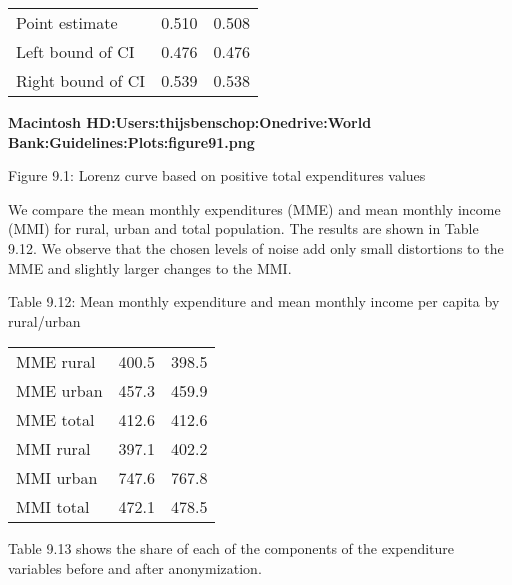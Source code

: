 \documentclass[letterpaper,10pt,english]{sphinxmanual}
\begin{document}
\begin{savenotes}\sphinxattablestart
\centering
\begin{tabulary}{\linewidth}[t]{|T|T|T|}
\hline
\sphinxstyletheadfamily &\sphinxstyletheadfamily 
{}
&\sphinxstyletheadfamily 
{}
\\
\hline
Point estimate
&
0.510
&
0.508
\\
\hline
Left bound of CI
&
0.476
&
0.476
\\
\hline
Right bound of CI
&
0.539
&
0.538
\\
\hline
\end{tabulary}
\par
\sphinxattableend\end{savenotes}

{\color{red}\bfseries{}\textbar{}Macintosh HD:Users:thijsbenschop:Onedrive:World
Bank:Guidelines:Plots:figure91.png\textbar{}}

Figure 9.1: Lorenz curve based on positive total expenditures values

We compare the mean monthly expenditures (MME) and mean monthly income
(MMI) for rural, urban and total population. The results are shown in
Table 9.12. We observe that the chosen levels of noise add only small
distortions to the MME and slightly larger changes to the MMI.

Table 9.12: Mean monthly expenditure and mean monthly income per capita
by rural/urban


\begin{savenotes}\sphinxattablestart
\centering
\begin{tabulary}{\linewidth}[t]{|T|T|T|}
\hline
\sphinxstyletheadfamily &\sphinxstyletheadfamily 
{}
&\sphinxstyletheadfamily 
{}
\\
\hline
MME rural
&
400.5
&
398.5
\\
\hline
MME urban
&
457.3
&
459.9
\\
\hline
MME total
&
412.6
&
412.6
\\
\hline
MMI rural
&
397.1
&
402.2
\\
\hline
MMI urban
&
747.6
&
767.8
\\
\hline
MMI total
&
472.1
&
478.5
\\
\hline
\end{tabulary}
\par
\sphinxattableend\end{savenotes}

Table 9.13 shows the share of each of the components of the expenditure
variables before and after anonymization.
\end{document}
